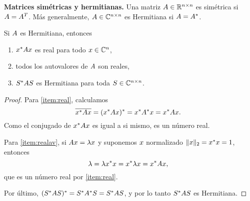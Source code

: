 \textbf{Matrices simétricas y hermitianas.} Una matriz $\Ab \in \Rnn$ es simétrica si $\Ab = \Ab^T$. Más generalmente, $\Ab \in \Cnn$ es Hermitiana si $\Ab = \Ab^*$.

\begin{prop}
Si $\Ab$ es Hermitiana, entonces
\begin{enumerate}
\item \label{item:real} $\xb^* \Ab \xb$ es real para todo $\xb \in \Cn$,
\item \label{item:realav} todos los autovalores de $\Ab$ son reales,
\item $\Sb^* \Ab \Sb$ es Hermitiana para toda $\Sb \in \Cnn$.
\end{enumerate}
\end{prop}

\begin{proof}
Para \ref{item:real}, calculamos
$$
\overline{\xb^* \Ab \xb} = (\xb^* \Ab \xb)^* = \xb^* \Ab^* \xb = \xb^* \Ab \xb.
$$
Como el conjugado de $\xb^* \Ab \xb$ es igual a si mismo, es un n\'umero real.

Para \ref{item:realav}, si $\Ab \xb = \lambda \xb$ y suponemos $\xb$ normalizado $\|\xb\|_2 = \xb^* \xb = 1$, entonces
$$\lambda = \lambda \xb^* \xb = \xb^* \lambda  \xb =  \xb^* \Ab  \xb,$$
que es un n\'umero real por \ref{item:real}.

Por \'ultimo, $(\Sb^* \Ab \Sb)^* = \Sb^* \Ab^* \Sb = \Sb^* \Ab \Sb$, y por lo tanto $\Sb^* \Ab \Sb$ es Hermitiana.
\end{proof}

